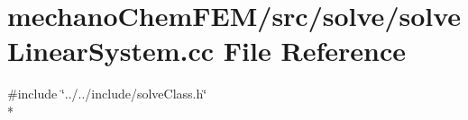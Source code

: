 \section{mechano\-Chem\-F\-E\-M/src/solve/solve\-Linear\-System.cc File Reference}
\label{solve_linear_system_8cc}
{\ttfamily \#include \char`\"{}../../include/solve\-Class.\-h\char`\"{}}\\*
